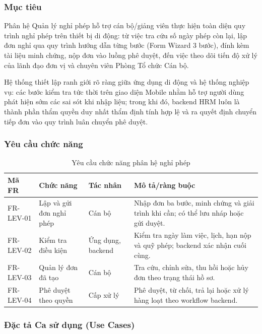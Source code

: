 \subsubsection{Mục tiêu}
Phân hệ Quản lý nghỉ phép hỗ trợ cán bộ/giảng viên thực hiện toàn diện quy trình nghỉ phép trên thiết bị di động: từ việc tra cứu số ngày phép còn lại, lập đơn nghỉ qua quy trình hướng dẫn từng bước (Form Wizard 3 bước), đính kèm tài liệu minh chứng, nộp đơn vào luồng phê duyệt, đến việc theo dõi tiến độ xử lý của lãnh đạo đơn vị và chuyên viên Phòng Tổ chức Cán bộ.

Hệ thống thiết lập ranh giới rõ ràng giữa ứng dụng di động và hệ thống nghiệp vụ: các bước kiểm tra tức thời trên giao diện Mobile nhằm hỗ trợ người dùng phát hiện sớm các sai sót khi nhập liệu; trong khi đó, backend HRM luôn là thành phần thẩm quyền duy nhất thẩm định tính hợp lệ và ra quyết định chuyển tiếp đơn vào quy trình luân chuyển phê duyệt.

\subsubsection{Yêu cầu chức năng}

\begin{table}[H]
\centering
\small
\caption{Yêu cầu chức năng phân hệ nghỉ phép}
\label{tab:fr_leave}
\begin{tabularx}{\textwidth}{|L{1.7cm}|L{3.0cm}|L{2.4cm}|Y|}
\hline
\textbf{Mã FR} & \textbf{Chức năng} & \textbf{Tác nhân} & \textbf{Mô tả/ràng buộc} \\
\hline
FR-LEV-01 & Lập và gửi đơn nghỉ phép & Cán bộ & Nhập đơn ba bước, minh chứng và giải trình khi cần; có thể lưu nháp hoặc gửi duyệt. \\
\hline
FR-LEV-02 & Kiểm tra điều kiện & Ứng dụng, backend & Kiểm tra ngày làm việc, lịch, hạn nộp và quỹ phép; backend xác nhận cuối cùng. \\
\hline
FR-LEV-03 & Quản lý đơn đã tạo & Cán bộ & Tra cứu, chỉnh sửa, thu hồi hoặc hủy đơn theo trạng thái hồ sơ. \\
\hline
FR-LEV-04 & Phê duyệt theo quyền & Cấp xử lý & Phê duyệt, từ chối, trả lại hoặc xử lý hàng loạt theo workflow backend. \\
\hline
\end{tabularx}
\end{table}

\subsubsection{Đặc tả Ca sử dụng (Use Cases)}

